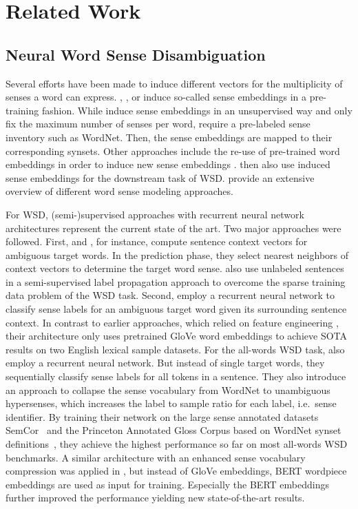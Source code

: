 \documentclass[11pt]{article}
\begin{document}
\section{Related Work}

\subsection{Neural Word Sense Disambiguation}Several efforts have been made to induce different vectors for the multiplicity of senses a word can express.
, ,  or  induce so-called sense embeddings in a pre-training fashion.
While  induce sense embeddings in an unsupervised way and only fix the maximum number of senses per word,  require a pre-labeled sense inventory such as WordNet. Then, the sense embeddings are mapped to their corresponding synsets.
Other approaches include the re-use of pre-trained word embeddings in order to induce new sense embeddings \cite{pelevina:2016:RepL4NLP,remus:2018:lrec}.
 then also use induced sense embeddings for the downstream task of WSD.
 provide an extensive overview of different word sense modeling approaches.

For WSD, \mbox{(semi-)}supervised approaches with recurrent neural network architectures represent the current state of the art.
Two major approaches were followed. 
First,  and , for instance, compute sentence context vectors for ambiguous target words. 
In the prediction phase, they select nearest neighbors of context vectors to determine the target word sense.
 also use unlabeled sentences in a semi-supervised label propagation approach to overcome the sparse training data problem of the WSD task.
Second,  employ a recurrent neural network to classify sense labels for an ambiguous target word given its surrounding sentence context. In contrast to earlier approaches, which relied on feature engineering  \cite{taghipour-ng-2015-semi}, their architecture only uses pretrained GloVe word embeddings \cite{pennington2014glove} to achieve SOTA results on two English lexical sample datasets.
For the all-words WSD task,  also employ a recurrent neural network. But instead of single target words, they sequentially classify sense labels for all tokens in a sentence.
They also introduce an approach to collapse the sense vocabulary from WordNet to unambiguous hypersenses, which increases the label to sample ratio for each label, i.e.\ sense identifier.
By training their network on the large sense annotated datasets SemCor~\cite{miller.1993} and the Princeton Annotated Gloss Corpus based on WordNet synset definitions~\cite{fellbaum.1998}, they achieve the highest performance so far on most all-words WSD benchmarks.
A similar architecture with an enhanced sense vocabulary compression was applied in \cite{vial.2019}, but instead of GloVe embeddings, BERT wordpiece embeddings \cite{devlin.2019} are used as input for training. Especially the BERT embeddings further improved the performance yielding new state-of-the-art results.
\end{document}
